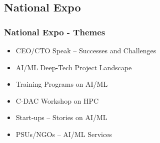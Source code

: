 \documentclass[aspectratio=169]{beamer}
\begin{document}
\subsection{National Expo}
\begin{frame}[fragile=singleslide]{\insertsubsectionhead}
  \frametitle {National Expo - Themes}
\begin{center}
\begin{itemize}
   \item CEO/CTO Speak – Successes and Challenges
    \item AI/ML Deep-Tech Project Landscape
    \item Training Programs on AI/ML
    \item C-DAC Workshop on HPC
    \item Start-ups – Stories on AI/ML
    \item PSUs/NGOs – AI/ML Services
\end{itemize}
\end{center}
\end{frame}
%
%
%
\end{document}

